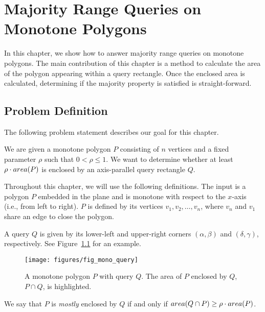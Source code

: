 \chapter{Majority Range Queries on Monotone Polygons}
\label{:monotonep}


In this chapter, we show how to answer majority range queries on monotone polygons. The main contribution of this chapter is a method to calculate the area of the polygon appearing within a query rectangle. Once the enclosed area is calculated, determining if the majority property is satisfied is straight-forward.


\section{Problem Definition}
\label{:monotonep:problem-definition}

The following problem statement describes our goal for this chapter.

\begin{problem}
We are given a monotone polygon $P$ consisting of $n$ vertices and a fixed parameter $\rho$ such that $0 < \rho \leq 1$. We want to determine whether at least $\rho \cdot area(P)$ is enclosed by an axis-parallel query rectangle $Q$.
\end{problem}

Throughout this chapter, we will use the following definitions. The input is a polygon $P$ embedded in the plane and is monotone with respect to the $x$-axis (i.e., from left to right). $P$ is defined by its vertices $v_1, v_2, \ldots, v_n$, where $v_n$ and $v_1$ share an edge to close the polygon. 

A query $Q$ is given by its lower-left and upper-right corners $(\alpha, \beta)$ and $(\delta, \gamma)$, respectively. See Figure~\ref{fig:monotonep:query-example} for an example.

\begin{figure}[t]
\begin{center}
  \texttt{[image: figures/fig\_mono\_query]}
  \caption[A monotone polygon $P$ with query $Q$]{A monotone polygon $P$ with query $Q$. The area of $P$ enclosed by $Q$, $P \cap Q$, is highlighted.}
  \label{fig:monotonep:query-example}
\end{center}
\end{figure}

We say that $P$ is \emph{mostly} enclosed by $Q$ if and only if $area(Q \cap P) \geq \rho \cdot area(P)$.



